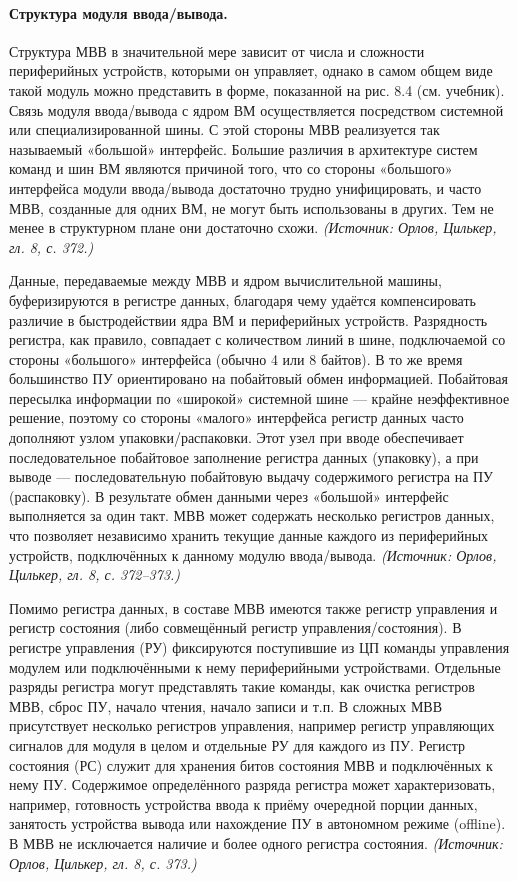 \documentclass[a4paper,12pt]{article}
\begin{document}
\paragraph{Структура модуля ввода/вывода.}
Структура МВВ в значительной мере зависит от числа и сложности периферийных устройств, которыми он управляет, однако в самом общем виде такой модуль можно представить в форме, показанной на рис. 8.4 (см. учебник). Связь модуля ввода/вывода с ядром ВМ осуществляется посредством системной или специализированной шины. С этой стороны МВВ реализуется так называемый «большой» интерфейс. Большие различия в архитектуре систем команд и шин ВМ являются причиной того, что со стороны «большого» интерфейса модули ввода/вывода достаточно трудно унифицировать, и часто МВВ, созданные для одних ВМ, не могут быть использованы в других. Тем не менее в структурном плане они достаточно схожи.
\textit{(Источник: Орлов, Цилькер, гл. 8, с. 372.)}

Данные, передаваемые между МВВ и ядром вычислительной машины, буферизируются в регистре данных, благодаря чему удаётся компенсировать различие в быстродействии ядра ВМ и периферийных устройств. Разрядность регистра, как правило, совпадает с количеством линий в шине, подключаемой со стороны «большого» интерфейса (обычно 4 или 8 байтов). В то же время большинство ПУ ориентировано на побайтовый обмен информацией. Побайтовая пересылка информации по «широкой» системной шине — крайне неэффективное решение, поэтому со стороны «малого» интерфейса регистр данных часто дополняют узлом упаковки/распаковки. Этот узел при вводе обеспечивает последовательное побайтовое заполнение регистра данных (упаковку), а при выводе — последовательную побайтовую выдачу содержимого регистра на ПУ (распаковку). В результате обмен данными через «большой» интерфейс выполняется за один такт. МВВ может содержать несколько регистров данных, что позволяет независимо хранить текущие данные каждого из периферийных устройств, подключённых к данному модулю ввода/вывода.
\textit{(Источник: Орлов, Цилькер, гл. 8, с. 372--373.)}

Помимо регистра данных, в составе МВВ имеются также регистр управления и регистр состояния (либо совмещённый регистр управления/состояния). В регистре управления (РУ) фиксируются поступившие из ЦП команды управления модулем или подключёнными к нему периферийными устройствами. Отдельные разряды регистра могут представлять такие команды, как очистка регистров МВВ, сброс ПУ, начало чтения, начало записи и т.п. В сложных МВВ присутствует несколько регистров управления, например регистр управляющих сигналов для модуля в целом и отдельные РУ для каждого из ПУ. Регистр состояния (РС) служит для хранения битов состояния МВВ и подключённых к нему ПУ. Содержимое определённого разряда регистра может характеризовать, например, готовность устройства ввода к приёму очередной порции данных, занятость устройства вывода или нахождение ПУ в автономном режиме (offline). В МВВ не исключается наличие и более одного регистра состояния.
\textit{(Источник: Орлов, Цилькер, гл. 8, с. 373.)}
\end{document}
